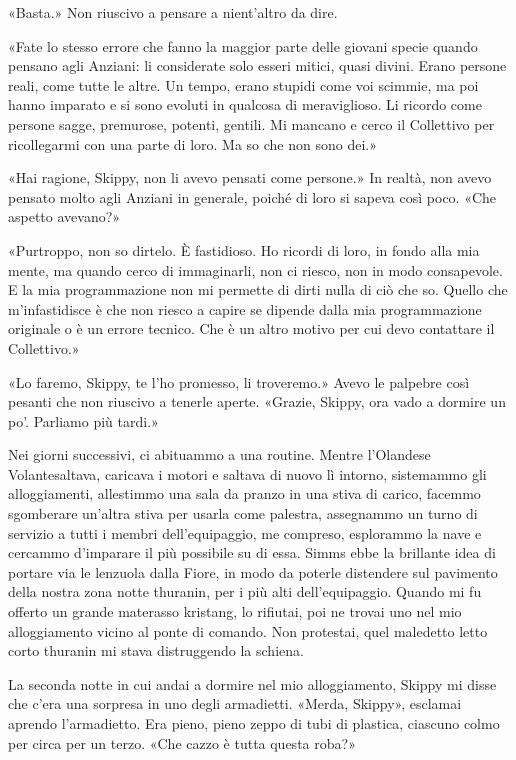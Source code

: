 «Basta.» Non riuscivo a pensare a nient'altro da dire.

«Fate lo stesso errore che fanno la maggior parte delle giovani specie
quando pensano agli Anziani: li considerate solo esseri mitici, quasi
divini. Erano persone reali, come tutte le altre. Un tempo, erano
stupidi come voi scimmie, ma poi hanno imparato e si sono evoluti in
qualcosa di meraviglioso. Li ricordo come persone sagge, premurose,
potenti, gentili. Mi mancano e cerco il Collettivo per ricollegarmi con
una parte di loro. Ma so che non sono dei.»

«Hai ragione, Skippy, non li avevo pensati come persone.» In realtà, non
avevo pensato molto agli Anziani in generale, poiché di loro si sapeva
così poco. «Che aspetto avevano?»

«Purtroppo, non so dirtelo. È fastidioso. Ho ricordi di loro, in fondo
alla mia mente, ma quando cerco di immaginarli, non ci riesco, non in
modo consapevole. E la mia programmazione non mi permette di dirti nulla
di ciò che so. Quello che m'infastidisce è che non riesco a capire se
dipende dalla mia programmazione originale o è un errore tecnico. Che è
un altro motivo per cui devo contattare il Collettivo.»

«Lo faremo, Skippy, te l'ho promesso, li troveremo.» Avevo le palpebre
così pesanti che non riuscivo a tenerle aperte. «Grazie, Skippy, ora
vado a dormire un po'. Parliamo più tardi.»

\hfill\break

Nei giorni successivi, ci abituammo a una routine. Mentre l'Olandese
Volantesaltava, caricava i motori e saltava di nuovo lì intorno,
sistemammo gli alloggiamenti, allestimmo una sala da pranzo in una stiva
di carico, facemmo sgomberare un'altra stiva per usarla come palestra,
assegnammo un turno di servizio a tutti i membri dell'equipaggio, me
compreso, esplorammo la nave e cercammo d'imparare il più possibile su
di essa. Simms ebbe la brillante idea di portare via le lenzuola dalla
Fiore, in modo da poterle distendere sul pavimento della nostra zona
notte thuranin, per i più alti dell'equipaggio. Quando mi fu offerto un
grande materasso kristang, lo rifiutai, poi ne trovai uno nel mio
alloggiamento vicino al ponte di comando. Non protestai, quel maledetto
letto corto thuranin mi stava distruggendo la schiena.

\hfill\break

La seconda notte in cui andai a dormire nel mio alloggiamento, Skippy mi
disse che c'era una sorpresa in uno degli armadietti. «Merda, Skippy»,
esclamai aprendo l'armadietto. Era pieno, pieno zeppo di tubi di
plastica, ciascuno colmo per circa per un terzo. «Che cazzo è tutta
questa roba?»

